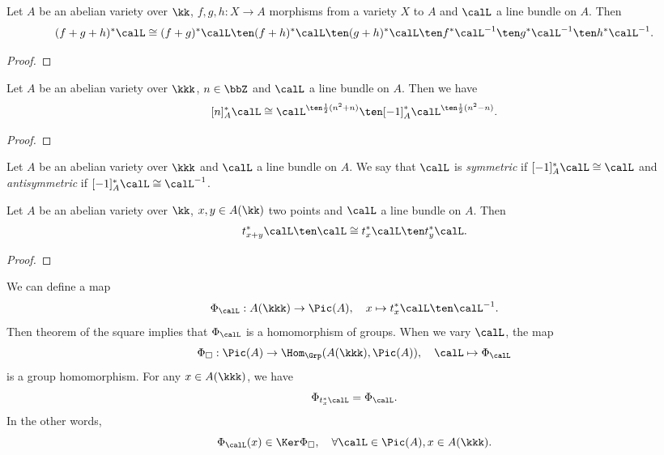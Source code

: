     \begin{proposition}
        Let \(A\) be an abelian variety over \(\kk\), \(f,g,h: X \to A\) morphisms from a variety \(X\) to \(A\) and \(\calL\) a line bundle on \(A\).
        Then 
        \[ (f+g+h)^*\calL \cong (f+g)^*\calL \ten (f+h)^*\calL \ten (g+h)^*\calL \ten f^*\calL^{-1} \ten g^*\calL^{-1} \ten h^*\calL^{-1}. \]
    \end{proposition}
    \begin{proof}
    \end{proof}

    \begin{proposition}\label{prop: pull back of line bundles along the multiplication by n}
        Let \(A\) be an abelian variety over \(\kkk\), \(n\in \bbZ\) and \(\calL\) a line bundle on \(A\). 
        Then we have 
        \[ [n]_A^*\calL \cong \calL^{\ten \frac{1}{2}(n^2+n)} \ten [-1]_A^*\calL^{\ten \frac{1}{2}(n^2-n)}. \]
    \end{proposition}
    \begin{proof}
    \end{proof}

    \begin{definition}\label{def:symmetric_and_antisymmetric_line_bundles}
        Let \(A\) be an abelian variety over \(\kkk\) and \(\calL\) a line bundle on \(A\).
        We say that \(\calL\) is \emph{symmetric} if \([-1]_A^*\calL \cong \calL\) and \emph{antisymmetric} if \([-1]_A^*\calL \cong \calL^{-1}\).
    \end{definition}

    \begin{theorem}\label{thm: theorem of the square}
        Let \(A\) be an abelian variety over \(\kk\), \(x,y \in A(\kk)\) two points and \(\calL\) a line bundle on \(A\).
        Then 
        \[ t_{x+y}^*\calL \ten \calL \cong t_x^*\calL \ten t_y^*\calL. \]
    \end{theorem}
    \begin{proof}
    \end{proof}

    \begin{remark}\label{rmk: theorem of the square and homomorphism to Picard group}
        We can define a map
        \[ \Phi_\calL: A(\kkk) \to \Pic(A), \quad x \mapsto t_x^*\calL \ten \calL^{-1}. \]
        Then theorem of the square implies that \(\Phi_\calL\) is a homomorphism of groups.
        When we vary \(\calL\), the map 
        \[ \Phi_{\square}: \Pic(A) \to \Hom_{\Grp}(A(\kkk), \Pic(A)), \quad \calL \mapsto \Phi_\calL \]
        is a group homomorphism.
        For any \(x \in A(\kkk)\), we have
        \[ \Phi_{t_x^*\calL} = \Phi_\calL. \]
        In the other words, 
        \[ \Phi_\calL(x) \in \Ker \Phi_{\square}, \quad \forall \calL \in \Pic(A), x \in A(\kkk). \]
    \end{remark}

